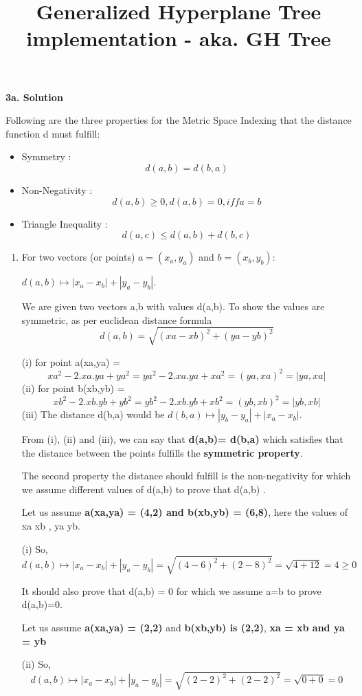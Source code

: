 \documentclass{article}
\title{Generalized Hyperplane Tree implementation - aka. GH Tree}
\begin{document}
\textbf{3a. Solution}

Following are the three properties for the Metric Space Indexing that the distance function d must fulfill:
 \begin{itemize}
     \item Symmetry : \[d(a,b) = d(b,a) \]
     \item Non-Negativity : \[d(a,b) \ge 0 , d(a,b) = 0, iff a = b\]
     \item Triangle Inequality : \[d(a,c) \leq d(a,b) + d(b,c) \]
 \end{itemize}
    \begin{enumerate}

   \item\label{l1} 
   For two vectors (or points) $a=(x_a, y_a)$ and $b=(x_b, y_b)$:

 $d(a, b) \mapsto | x_a - x_b | + | y_a - y_b |$.  

We are given two vectors a,b with values d(a,b). To show the values are symmetric, as per euclidean distance formula 
        \[d(a,b) = \sqrt{(xa-xb)^2 + (ya-yb)^2}\]

        (i) \quad for point a(xa,ya) = \[xa^2 - 2.xa.ya + ya^2 = ya^2 - 2.xa.ya + xa^2 = (ya,xa)^2 = |ya,xa|\]
        (ii) for point b(xb,yb) = \[xb^2 - 2.xb.yb + yb^2 = yb^2 - 2.xb.yb + xb^2 = (yb,xb)^2 = |yb,xb|\] 
        (iii) The distance d(b,a) would be  $d(b, a) \mapsto | y_b - y_a | + | x_a - x_b |$.

        From (i), (ii) and (iii), we can say that \textbf{d(a,b)= d(b,a)} which satisfies that the distance between the points fulfills the \textbf{symmetric property}.

The second property the distance should fulfill is the non-negativity for which we assume different values of d(a,b) to prove that d(a,b) .

      Let us assume\textbf{ a(xa,ya) = (4,2) and b(xb,yb) = (6,8)}, here the values of xa \neq xb ,  ya \neq yb.
      
     (i) So, \[d(a, b) \mapsto | x_a - x_b | + | y_a - y_b |= \sqrt{(4-6)^2 + (2-8)^2 } = \sqrt {4 +12} = 4 \geq 0\]
     
     It should also prove that d(a,b) = 0 for which we assume a=b to prove d(a,b)=0.
    
     Let us assume\textbf{ a(xa,ya) = (2,2)} and \textbf{b(xb,yb) is (2,2)},\textbf{ xa = xb and ya = yb}
    
     (ii) So, \[d(a, b) \mapsto | x_a - x_b | + | y_a - y_b |= \sqrt{(2-2)^2 + (2-2)^2 } = \sqrt {0 +0} = 0\]
    

\end{enumerate}
\end{document}
